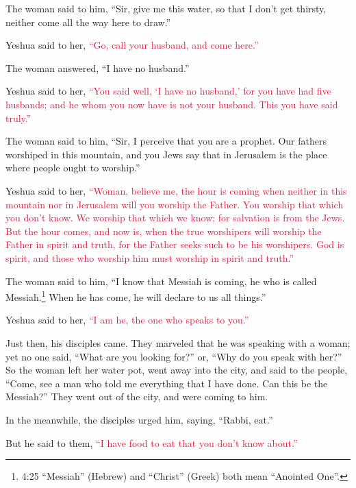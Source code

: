 \myverse{}The woman said to him, “Sir, give me this water, so that I don’t
get thirsty, neither come all the way here to draw.”

\myverse{}Yeshua said to her,
\textcolor{crimson}{“Go, call your husband, and come here.”
}

\myverse{}The woman answered, “I have no husband.”

Yeshua said to her,
\textcolor{crimson}{“You said well, ‘I have no husband,’
}
\myverse{}\textcolor{crimson}{for you have had five husbands; and he whom you now have is not your husband.
	This you have said truly.”}

\myverse{}The woman said to him, “Sir, I perceive that you are a prophet.
\myverse{}Our fathers worshiped in this mountain, and you Jews say that in Jerusalem
is the place where people ought to worship.”

\myverse{}Yeshua said to her,
\textcolor{crimson}{“Woman, believe me, the hour is coming when neither in this mountain nor in Jerusalem will you worship
	the Father.
}
\myverse{}\textcolor{crimson}{You worship that which you don’t know. We worship that which we know;
	for salvation is from the Jews.
}
\myverse{}\textcolor{crimson}{But the hour comes, and now is, when the true worshipers will worship
	the Father in spirit and truth, for the Father seeks such to be his worshipers.
}
\myverse{}\textcolor{crimson}{God is spirit, and those who worship him must worship in spirit and truth.”}

\myverse{}The woman said to him, “I know that Messiah is coming, he who
is called Messiah.\footnote{4:25 “Messiah” (Hebrew) and “Christ” (Greek) both mean “Anointed One”.} When he has come,
he will declare to us all things.”

\myverse{}Yeshua said to her,
\textcolor{crimson}{“I am he, the one who speaks to you.”}

\myverse{}Just then, his disciples came. They marveled that he was speaking
with a woman; yet no one said, “What are you looking for?” or, “Why do you speak with her?”
\myverse{}So the woman left her water pot, went away into the city, and said to the
people,
\myverse{}“Come, see a man who told me everything that I have done. Can this be the
Messiah?”
\myverse{}They went out of the city, and were coming to him.

\myverse{}In the meanwhile, the disciples urged him, saying, “Rabbi, eat.”

\myverse{}But he said to them,
\textcolor{crimson}{“I have food to eat that you don’t know about.”}

